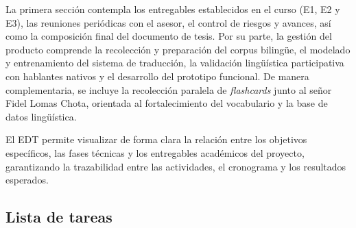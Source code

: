 \documentclass[12pt,a4paper,oneside]{book}
\begin{document}
La primera sección contempla los entregables establecidos en el curso (E1, E2 y E3), las reuniones periódicas con el asesor, el control de riesgos y avances, así como la composición final del documento de tesis. Por su parte, la gestión del producto comprende la recolección y preparación del corpus bilingüe, el modelado y entrenamiento del sistema de traducción, la validación lingüística participativa con hablantes nativos y el desarrollo del prototipo funcional. De manera complementaria, se incluye la recolección paralela de \emph{flashcards} junto al señor Fidel Lomas Chota, orientada al fortalecimiento del vocabulario y la base de datos lingüística.

El EDT permite visualizar de forma clara la relación entre los objetivos específicos, las fases técnicas y los entregables académicos del proyecto, garantizando la trazabilidad entre las actividades, el cronograma y los resultados esperados.

\subsection*{Lista de tareas}
\end{document}
